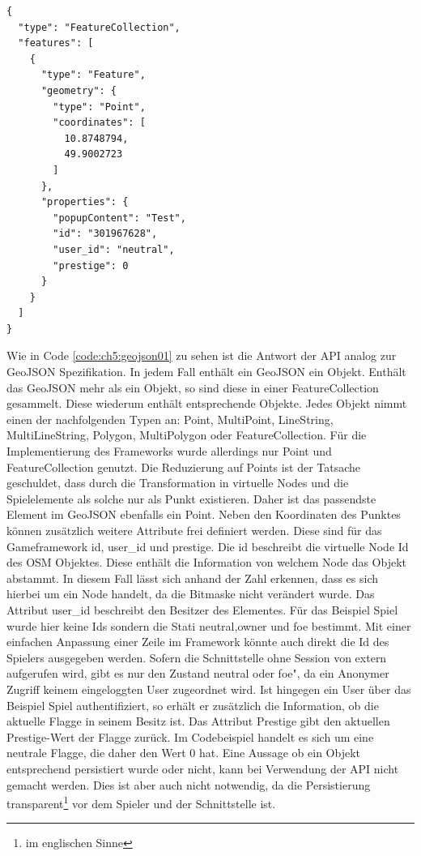 \begin{lstlisting}[caption=GeoJSON Response Location (Reduziert), label=code:ch5:geojson01]
{
  "type": "FeatureCollection",
  "features": [
    {
      "type": "Feature",
      "geometry": {
        "type": "Point",
        "coordinates": [
          10.8748794,
          49.9002723
        ]
      },
      "properties": {
        "popupContent": "Test",
        "id": "301967628",
        "user_id": "neutral",
        "prestige": 0
      }
    }
  ]
}
\end{lstlisting}

Wie in Code \ref{code:ch5:geojson01} zu sehen ist die Antwort der API analog zur GeoJSON Spezifikation.\cite{Butler.2008}
In jedem Fall enthält ein GeoJSON ein Objekt. Enthält das GeoJSON mehr als ein Objekt, so sind diese in einer FeatureCollection gesammelt. Diese wiederum enthält entsprechende Objekte.
Jedes Objekt nimmt einen der nachfolgenden Typen an:
 \glqq Point\grqq{}, \glqq MultiPoint\grqq{}, \glqq LineString\grqq{}, \glqq MultiLineString\grqq{}, \glqq Polygon\grqq{}, \glqq MultiPolygon\grqq{} oder \glqq FeatureCollection\grqq{}.
Für die Implementierung des Frameworks wurde allerdings nur Point und FeatureCollection genutzt. Die Reduzierung auf Points ist der Tatsache geschuldet, dass durch die Transformation in virtuelle Nodes und die Spielelemente als solche nur als Punkt existieren. Daher ist das passendste Element im GeoJSON ebenfalls ein Point. Neben den Koordinaten des Punktes können zusätzlich weitere Attribute frei definiert werden. Diese sind für das Gameframework id, user\_id und prestige. Die id beschreibt die virtuelle Node Id des OSM Objektes. Diese enthält die Information von welchem Node das Objekt abstammt. In diesem Fall lässt sich anhand der Zahl erkennen, dass es sich hierbei um ein Node handelt, da die Bitmaske nicht verändert wurde. Das Attribut user\_id beschreibt den Besitzer des Elementes. Für das Beispiel Spiel wurde hier keine Ids sondern die Stati \glqq neutral\grqq{},\glqq owner\grqq{} und \glqq foe\grqq{} bestimmt. Mit einer einfachen Anpassung einer Zeile im Framework könnte auch direkt die Id des Spielers ausgegeben werden. Sofern die Schnittstelle ohne Session von extern aufgerufen wird, gibt es nur den Zustand \glqq neutral\grqq{} oder \glqq foe", da ein Anonymer Zugriff keinem eingeloggten User zugeordnet wird. Ist hingegen ein User über das Beispiel Spiel authentifiziert, so erhält er zusätzlich die Information, ob die aktuelle Flagge in seinem Besitz ist.
Das Attribut Prestige gibt den aktuellen Prestige-Wert der Flagge zurück. Im Codebeispiel handelt es sich um eine neutrale Flagge, die daher den Wert 0 hat. Eine Aussage ob ein Objekt entsprechend persistiert wurde oder nicht, kann bei Verwendung der API nicht gemacht werden. Dies ist aber auch nicht notwendig, da 
die Persistierung transparent\footnote{im englischen Sinne} vor dem Spieler und der Schnittstelle ist.

